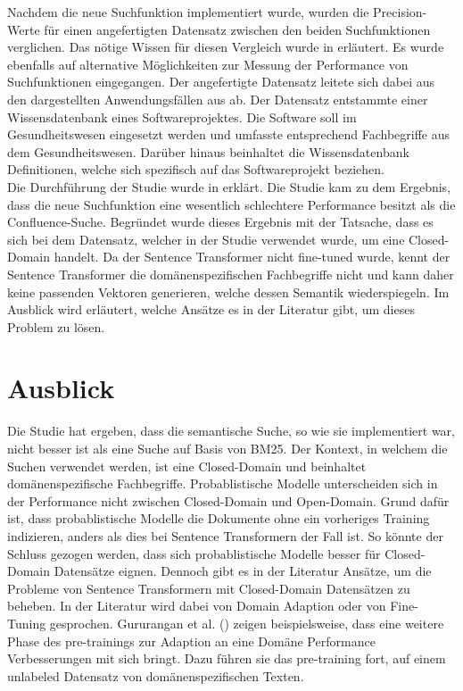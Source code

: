 Nachdem die neue Suchfunktion implementiert wurde, wurden die Precision-Werte für einen angefertigten Datensatz zwischen den beiden Suchfunktionen verglichen.
Das nötige Wissen für diesen Vergleich wurde in  erläutert.
Es wurde ebenfalls auf alternative Möglichkeiten zur Messung der Performance von Suchfunktionen eingegangen.
Der angefertigte Datensatz leitete sich dabei aus den dargestellten Anwendungsfällen aus  ab.
Der Datensatz entstammte einer Wissensdatenbank eines Softwareprojektes.
Die Software soll im Gesundheitswesen eingesetzt werden und umfasste entsprechend Fachbegriffe aus dem Gesundheitswesen.
Darüber hinaus beinhaltet die Wissensdatenbank Definitionen, welche sich spezifisch auf das Softwareprojekt beziehen.\\

Die Durchführung der Studie wurde in  erklärt.
Die Studie kam zu dem Ergebnis, dass die neue Suchfunktion eine wesentlich schlechtere Performance besitzt als die Confluence-Suche.
Begründet wurde dieses Ergebnis mit der Tatsache, dass es sich bei dem Datensatz, welcher in der Studie verwendet wurde, um eine Closed-Domain handelt.
Da der Sentence Transformer nicht fine-tuned wurde, kennt der Sentence Transformer die domänenspezifischen Fachbegriffe nicht und kann daher keine passenden Vektoren generieren, welche dessen Semantik wiederspiegeln.
Im Ausblick wird erläutert, welche Ansätze es in der Literatur gibt, um dieses Problem zu lösen.

\section{Ausblick}
\label{chap:ausblick}
Die Studie hat ergeben, dass die semantische Suche, so wie sie implementiert war, nicht besser ist als eine Suche auf Basis von BM25.
Der Kontext, in welchem die Suchen verwendet werden, ist eine Closed-Domain und beinhaltet domänenspezifische Fachbegriffe.
Probablistische Modelle unterscheiden sich in der Performance nicht zwischen Closed-Domain und Open-Domain.
Grund dafür ist, dass probablistische Modelle die Dokumente ohne ein vorheriges Training indizieren, anders als dies bei Sentence Transformern der Fall ist. 
So könnte der Schluss gezogen werden, dass sich probablistische Modelle besser für Closed-Domain Datensätze eignen.
Dennoch gibt es in der Literatur Ansätze, um die Probleme von Sentence Transformern mit Closed-Domain Datensätzen zu beheben.
In der Literatur wird dabei von Domain Adaption oder von Fine-Tuning gesprochen.
Gururangan et al. (\citeyear{Gururangan_Marasović_Swayamdipta_Lo_Beltagy_Downey_Smith_2020}) zeigen beispielsweise, dass eine weitere Phase des pre-trainings zur Adaption an eine Domäne Performance Verbesserungen mit sich bringt.
Dazu führen sie das pre-training fort, auf einem unlabeled Datensatz von domänenspezifischen Texten.\\

